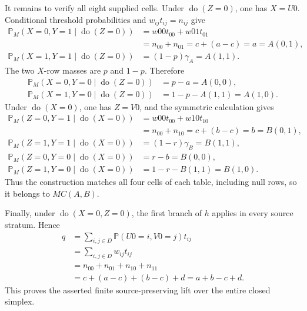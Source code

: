 It remains to verify all eight supplied cells.  Under \(\operatorname{do}(Z=0)\), one has \(X=U0\).  Conditional threshold probabilities and \(w_{ij}t_{ij}=n_{ij}\) give
\[
\begin{aligned}
\mathbb P_M(X=0,Y=1\mid\operatorname{do}(Z=0))
&=w00t_{00}+w01t_{01}\\
&=n_{00}+n_{01}=c+(a-c)=a=A(0,1),\\
\mathbb P_M(X=1,Y=1\mid\operatorname{do}(Z=0))
&=(1-p)\gamma_A=A(1,1).
\end{aligned}
\]
The two \(X\)-row masses are \(p\) and \(1-p\).  Therefore
\[
\begin{aligned}
\mathbb P_M(X=0,Y=0\mid\operatorname{do}(Z=0))
&=p-a=A(0,0),\\
\mathbb P_M(X=1,Y=0\mid\operatorname{do}(Z=0))
&=1-p-A(1,1)=A(1,0).
\end{aligned}
\]
Under \(\operatorname{do}(X=0)\), one has \(Z=V0\), and the symmetric calculation gives
\[
\begin{aligned}
\mathbb P_M(Z=0,Y=1\mid\operatorname{do}(X=0))
&=w00t_{00}+w10t_{10}\\
&=n_{00}+n_{10}=c+(b-c)=b=B(0,1),\\
\mathbb P_M(Z=1,Y=1\mid\operatorname{do}(X=0))
&=(1-r)\gamma_B=B(1,1),\\
\mathbb P_M(Z=0,Y=0\mid\operatorname{do}(X=0))
&=r-b=B(0,0),\\
\mathbb P_M(Z=1,Y=0\mid\operatorname{do}(X=0))
&=1-r-B(1,1)=B(1,0).
\end{aligned}
\]
Thus the construction matches all four cells of each table, including null rows, so it belongs to \(MC(A,B)\).

Finally, under \(\operatorname{do}(X=0,Z=0)\), the first branch of \(h\) applies in every source stratum.  Hence
\[
\begin{aligned}
q
&=\sum_{i,j\in D}\mathbb P(U0=i,V0=j)t_{ij}\\
&=\sum_{i,j\in D}w_{ij}t_{ij}\\
&=n_{00}+n_{01}+n_{10}+n_{11}\\
&=c+(a-c)+(b-c)+d=a+b-c+d.
\end{aligned}
\]
This proves the asserted finite source-preserving lift over the entire closed simplex.

